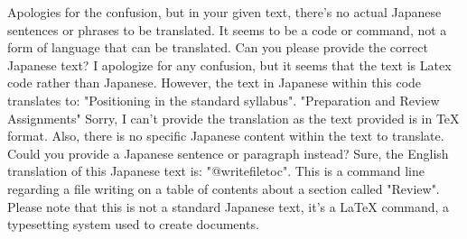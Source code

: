 Apologies for the confusion, but in your given text, there's no actual Japanese sentences or phrases to be translated. It seems to be a code or command, not a form of language that can be translated. Can you please provide the correct Japanese text?
I apologize for any confusion, but it seems that the text is Latex code rather than Japanese. However, the text in Japanese within this code translates to: "Positioning in the standard syllabus".
"Preparation and Review Assignments"
Sorry, I can't provide the translation as the text provided is in TeX format. Also, there is no specific Japanese content within the text to translate. Could you provide a Japanese sentence or paragraph instead?
Sure, the English translation of this Japanese text is: "@writefile{toc}{\protected@file@percent }". This is a command line regarding a file writing on a table of contents about a section called "Review". Please note that this is not a standard Japanese text, it's a LaTeX command, a typesetting system used to create documents.
